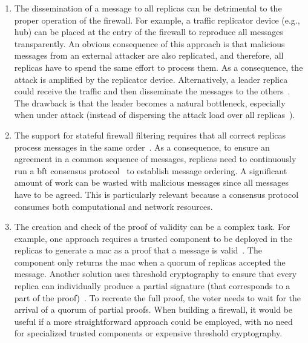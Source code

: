 \begin{enumerate}

\item The dissemination of a message to all replicas can be detrimental to the proper operation of the firewall. 
For example, a traffic replicator device (e.g., hub) can be placed at the entry of the firewall to reproduce all messages~\cite{Sousa:2010,Roeder:2010} transparently. 
An obvious consequence of this approach is that malicious messages from an external attacker are also replicated, and therefore, all replicas have to spend the same effort to process them.
As a consequence, the attack is amplified by the replicator device.
Alternatively, a leader replica could receive the traffic and then disseminate the messages to the others~\cite{Roeder:2010}.
The drawback is that the leader becomes a natural bottleneck, especially when under attack (instead of dispersing the attack load over all replicas~\cite{Amir:2011}).

\item The support for stateful firewall filtering requires that all correct replicas process messages in the same order~\cite{Schneider:1990}.
As a consequence, to ensure an agreement in a common sequence of messages, replicas need to continuously run a \gls{bft} consensus protocol~\cite{Castro:2002} to establish message ordering.
A significant amount of work can be wasted with malicious messages since all messages have to be agreed. This is particularly relevant because a consensus protocol consumes both computational and network resources.

\item The creation and check of the proof of validity can be a complex task. For example, one approach requires a trusted component to be deployed in the replicas to generate a \gls{mac} as a proof that a message is valid~\cite{Sousa:2010}. 
The component only returns the \gls{mac} when a quorum of replicas accepted the message. 
Another solution uses threshold cryptography to ensure that every replica can individually produce a partial signature (that corresponds to a part of the proof)~\cite{Roeder:2010}. 
To recreate the full proof, the voter needs to wait for the arrival of a quorum of partial proofs. 
When building a firewall, it would be useful if a more straightforward approach could be employed, with no need for specialized trusted components or expensive threshold cryptography.

\end{enumerate}

